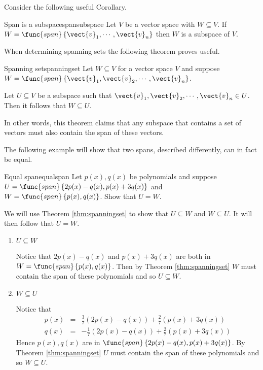 Consider the following useful Corollary.

\begin{corollary}{Span is a subspace}{spansubspace}
Let $V$ be a vector space with $W \subseteq V$. If $W = \func{span} \left\{ \vect{v}_1, \cdots,  \vect{v}_n \right\}$ then $W$ is a subspace of $V$.
\end{corollary}

When determining spanning sets the following theorem proves useful.

\begin{theorem}{Spanning set}{spanningset}
Let $W \subseteq V$ for a vector space $V$ and suppose $W = \func{span} \left\{ \vect{v}_1, \vect{v}_2, \cdots, \vect{v}_n \right\}$. 

Let $U \subseteq V$ be a subspace such that $\vect{v}_1, \vect{v}_2, \cdots, \vect{v}_n \in U$. Then it follows that $W \subseteq U$. 
\end{theorem}

In other words, this theorem claims that any subspace that contains a set of vectors must also contain the span of these vectors. 

The following example will show that two spans, described differently, can in fact be equal. 

\begin{example}{Equal span}{equalspan}
Let $p(x), q(x)$ be polynomials and suppose $U = \func{span}\left\{ 2p(x) - q(x), p(x) + 3q(x)\right\} $ and $W =  \func{span}\left\{ p(x), q(x) \right\}$. Show that $U = W$. 
\end{example}

\begin{solution}
We will use Theorem \ref{thm:spanningset} to show that $U \subseteq W$ and $W \subseteq U$. It will then follow that $U=W$. 
\begin{enumerate}
\item $U \subseteq W$

Notice that $2p(x) - q(x)$ and $p(x) + 3q(x)$  are both in $W = \func{span} \left\{ p(x), q(x) \right\}$. Then by Theorem \ref{thm:spanningset} $W$ must contain the span of these polynomials and so $U \subseteq W$. 

\item $W \subseteq U$

Notice that 
\begin{eqnarray*}
p(x) &=& \frac{3}{7} \left( 2p(x) - q(x) \right)  + \frac{2}{7} \left( p(x) + 3q(x)\right) \\
q(x) &=& -\frac{1}{7} \left( 2p(x) - q(x) \right)  + \frac{2}{7} \left( p(x) + 3q(x)\right)
\end{eqnarray*}
Hence $p(x), q(x)$ are in $\func{span} \left\{ 2p(x) - q(x), p(x) + 3q(x) \right\}$. By Theorem \ref{thm:spanningset} $U$ must contain the span of these polynomials and so $W \subseteq U$. 
\end{enumerate}
\end{solution}

